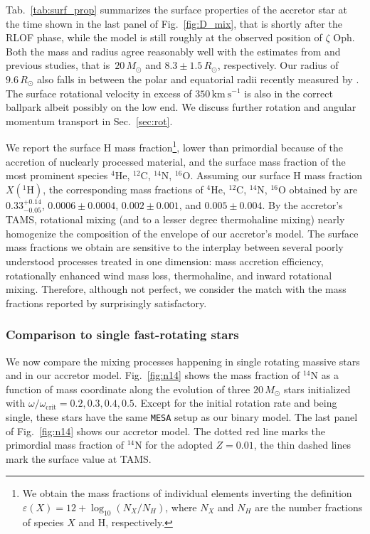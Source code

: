 \documentclass[twocolumn,twocolappendix,trackchanges]{aastex63}
\newcommand{\kms}{{\mathrm{km\ s^{-1}}}}
\DeclareRobustCommand{\Figref}[1]{Fig.~\ref{#1}}
\DeclareRobustCommand{\Tabref}[1]{Tab.~\ref{#1}}
\DeclareRobustCommand{\Secref}[1]{Sec.~\ref{#1}}
\newcommand{\zoph}{$\zeta$ Oph}
\begin{document}


\Tabref{tab:surf_prop} summarizes the surface properties of the
accretor star at the time shown in the last panel of
\Figref{fig:D_mix}, that is shortly after the RLOF phase, while the
model is still roughly at the observed position of \zoph. Both the
mass and radius agree reasonably well with the estimates from
 and previous studies, that is~$20\,M_\odot$
and $8.3\pm1.5\,R_\odot$, respectively. Our radius of $9.6\,R_\odot$
also falls in between the polar and equatorial radii recently measured
by \cite{gordon:18}. The surface rotational velocity in excess of
$350\,\kms$ is also in the correct ballpark albeit possibly on the low
end. We discuss further rotation and angular momentum transport in
\Secref{sec:rot}.

We report the surface H mass fraction\footnote{We obtain the mass
  fractions of individual elements inverting the definition
  $\varepsilon(X)=12+\log_{10}(N_X/N_H)$, where $N_X$ and $N_H$ are
  the number fractions of species $X$ and H, respectively.}, lower
than primordial because of the accretion of nuclearly processed
material, and the surface mass fraction of the most prominent species
$^4\mathrm{He}$, $^{12}\mathrm{C}$, $^{14}\mathrm{N}$,
$^{16}\mathrm{O}$.  Assuming our surface H mass fraction
$X(^1\mathrm{H})$, the corresponding mass fractions of
$^4\mathrm{He}$, $^{12}\mathrm{C}$, $^{14}\mathrm{N}$,
$^{16}\mathrm{O}$ obtained by  are
$0.33^{+0.14}_{-0.05}$, $0.0006\pm0.0004$, $0.002\pm0.001$, and
$0.005\pm0.004$.  By the accretor's TAMS, rotational mixing (and to a
lesser degree thermohaline mixing) nearly homogenize the composition
of the envelope of our accretor's model. The surface mass fractions we obtain are sensitive to
the interplay between several poorly understood processes treated in
one dimension: mass accretion efficiency, rotationally enhanced wind
mass loss, thermohaline, and inward rotational mixing. Therefore,
although not perfect, we consider the match with the mass fractions
reported by  surprisingly satisfactory.

\subsubsection{Comparison to single fast-rotating stars}
\label{sec:mix_comparison_single}

We now compare the mixing processes
happening in single rotating massive stars and in our accretor
model. \Figref{fig:n14} shows the mass fraction of $^{14}\mathrm{N}$
as a function of mass coordinate along the evolution of three
$20\,M_\odot$ stars initialized with
$\omega/\omega_\mathrm{crit}=0.2,0.3,0.4,0.5$. Except for the initial rotation rate and
being single, these stars have the same \texttt{MESA}
setup as our binary model. The last panel of \Figref{fig:n14} shows
our accretor model. The dotted red line marks the primordial mass
fraction of $^{14}\mathrm{N}$ for the adopted $Z=0.01$, the thin
dashed lines mark the surface value at TAMS.
\end{document}
